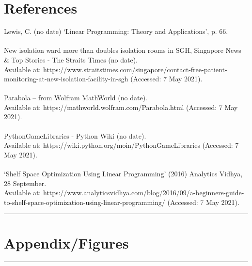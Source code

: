 \documentclass{article}
\begin{document}
\section{References}
Lewis, C. (no date) ‘Linear Programming: Theory and Applications’, p. 66.\\\\New isolation ward more than doubles isolation rooms in SGH, Singapore News \& Top Stories - The Straits Times (no date). \\
Available at: https://www.straitstimes.com/singapore/contact-free-patient-monitoring-at-new-isolation-facility-in-sgh (Accessed: 7 May 2021).\\\\Parabola -- from Wolfram MathWorld (no date). \\Available at: https://mathworld.wolfram.com/Parabola.html (Accessed: 7 May 2021).\\\\PythonGameLibraries - Python Wiki (no date). \\
Available at: https://wiki.python.org/moin/PythonGameLibraries (Accessed: 7 May 2021).\\\\‘Shelf Space Optimization Using Linear Programming’ (2016) Analytics Vidhya, 28 September. \\
Available at: https://www.analyticsvidhya.com/blog/2016/09/a-beginners-guide-to-shelf-space-optimization-using-linear-programming/ (Accessed: 7 May 2021).\\
\par\noindent\rule{\textwidth}{0.4pt}

\section{Appendix/Figures}


\par\noindent\rule{\textwidth}{0.4pt}
\end{document}
